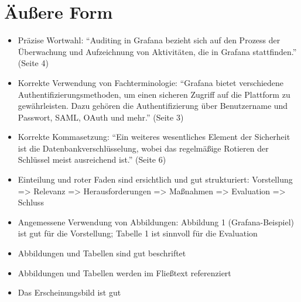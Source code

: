 \documentclass[a4paper,DIV=16]{scrartcl}
\begin{document}
\section*{Äußere Form}
  \begin{itemize}
    \item Präzise Wortwahl: "`Auditing in Grafana bezieht sich auf den Prozess
    der Überwachung und Aufzeichnung von Aktivitäten, die in Grafana
    stattfinden."' (Seite 4)
    \item Korrekte Verwendung von Fachterminologie: "`Grafana bietet
    verschiedene Authentifizierungsmethoden, um einen sicheren Zugriff auf die
    Plattform zu gewährleisten. Dazu gehören die Authentifizierung über
    Benutzername und Passwort, SAML, OAuth und mehr."' (Seite 3)
    \item Korrekte Kommasetzung: "`Ein weiteres wesentliches Element der
    Sicherheit ist die Datenbankverschlüsselung, wobei das regelmäßige Rotieren
    der Schlüssel meist ausreichend ist."' (Seite 6)
    \item Einteilung und roter Faden sind ersichtlich und gut strukturiert:
    Vorstellung => Relevanz => Herausforderungen => Maßnahmen =>  Evaluation =>
    Schluss
    \item Angemessene Verwendung von Abbildungen: Abbildung 1 (Grafana-Beispiel)
    ist gut für die Vorstellung; Tabelle 1 ist sinnvoll für die Evaluation
    \item Abbildungen und Tabellen sind gut beschriftet
    \item Abbildungen und Tabellen werden im Fließtext referenziert
    \item Das Erscheinungsbild ist gut
  \end{itemize}
  
\end{document}
